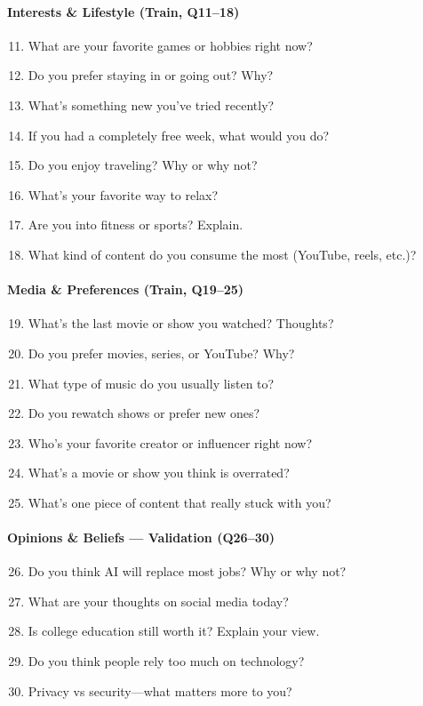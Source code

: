 \documentclass[11pt]{article}
\begin{document}
\paragraph{Interests \& Lifestyle (Train, Q11--18)}
\begin{enumerate}\setcounter{enumi}{10}
  \item What are your favorite games or hobbies right now?
  \item Do you prefer staying in or going out? Why?
  \item What's something new you've tried recently?
  \item If you had a completely free week, what would you do?
  \item Do you enjoy traveling? Why or why not?
  \item What's your favorite way to relax?
  \item Are you into fitness or sports? Explain.
  \item What kind of content do you consume the most (YouTube, reels, etc.)?
\end{enumerate}

\paragraph{Media \& Preferences (Train, Q19--25)}
\begin{enumerate}\setcounter{enumi}{18}
  \item What's the last movie or show you watched? Thoughts?
  \item Do you prefer movies, series, or YouTube? Why?
  \item What type of music do you usually listen to?
  \item Do you rewatch shows or prefer new ones?
  \item Who's your favorite creator or influencer right now?
  \item What's a movie or show you think is overrated?
  \item What's one piece of content that really stuck with you?
\end{enumerate}

\paragraph{Opinions \& Beliefs — Validation (Q26--30)}
\begin{enumerate}\setcounter{enumi}{25}
  \item Do you think AI will replace most jobs? Why or why not?
  \item What are your thoughts on social media today?
  \item Is college education still worth it? Explain your view.
  \item Do you think people rely too much on technology?
  \item Privacy vs security---what matters more to you?
\end{enumerate}
\end{document}
